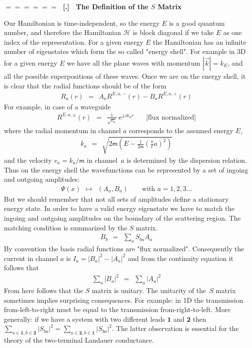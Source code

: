 \documentclass[onecolumn,fleqn]{revtex4}
\newcommand{\eexp}{\mathrm{e}^}
\newcommand{\mass}{\mathsf{m}}
\newcommand{\beq}{\begin{eqnarray}}
\newcommand{\eeq}{\end{eqnarray}}
\renewcommand{\thesubsection}{\arabic{subsection}}
\renewcommand{\thesubsubsection}{\arabic{subsubsection}}
\newcommand{\sheadC}[1]
{
\addtocounter{subsubsection}{1}
\vspace{5mm}
{\Large\bf $=\!=\!=\!=\!=\!=\;$ [\thesubsection.\thesubsubsection] \ #1}  
\nopagebreak
\phantomsection
}
\begin{document}
\sheadC{The Definition of the $S$ Matrix}

Our Hamiltonian is time-independent, so the energy $E$ 
is a good quantum number, and therefore 
the Hamiltonian $\mathcal{H}$ is block diagonal 
if we take $E$ as one index of the representation. 
For a given energy $E$ the Hamiltonian has 
an infinite number of eigenstates which form 
the so called "energy shell". 
For example in 3D for a given 
energy $E$ we have all the plane waves 
with momentum $|\vec{k}|=k_E$, and all the 
possible superpositions of these waves.    
Once we are on the energy shell, 
it is clear that the radial functions 
should be of the form
\beq
R_a(r) \ \ = \ \ A_a R^{E,a,-}(r) - B_a R^{E,a,+}(r)
\eeq
For example, in case of a waveguide
\beq
R^{E,a,\pm}(r) \ \ = \ \ \frac{1}{\sqrt{v_a}} \ \eexp{\pm i k_a r}
\ \ \ \ \ \ \ \ \mbox{[flux normalized]}
\eeq
where the radial momentum in channel $a$ 
corresponds to the assumed energy $E$,  
\beq
k_a \ \ = \ \ \sqrt{2\mass\left(E-\frac{1}{2\mass}\left(\frac{\pi}{\ell}a\right)^2\right)}
\eeq
and the velocity $v_a=k_a/\mass$  in channel~$a$ 
is determined by the dispersion relation. 
Thus on the energy shell the wavefunctions 
can be represented by a set of ingoing and outgoing amplitudes:
\beq
\Psi(x) \ \ \longmapsto \ \ (A_a,B_a)
\ \ \ \ \ \ \ \ \ \mbox{with $a=1,2,3 \dots $}
\eeq
But we should remember that not all sets of amplitudes 
define a stationary energy state. In order to have 
a valid energy eigenstate we have to match 
the ingoing and outgoing amplitudes on the 
boundary of the scattering region. The matching 
condition is summarized by the $S$ matrix.
\beq
B_b \ \ = \ \ \sum_a S_{ba} A_a
\eeq
By convention the basis radial functions are "flux normalized".
Consequently  the current in channel $a$ is  $I_a = |B_a|^2-|A_a|^2$ 
and from the continuity equation it follows that 
\beq
\sum_a |B_a|^2 \ \ = \ \ \sum_a |A_a|^2
\eeq
From here follows that the $S$ matrix is unitary. 
The unitarity of the~$S$ matrix sometimes implies 
surprising consequences. For example: in 1D the 
transmission from-left-to-right must be equal 
to the transmission from-right-to-left. 
More generally: if we have a system with two 
different leads $\bm{1}$ and $\bm{2}$ 
then ${\sum_{a\in\bm{1},b\in\bm{2}} |S_{ba}|^2 =\sum_{a\in\bm{2},b\in\bm{1}} |S_{ba}|^2}$. 
The latter observation is essential 
for the theory of the two-terminal Landauer conductance. 
\end{document}
